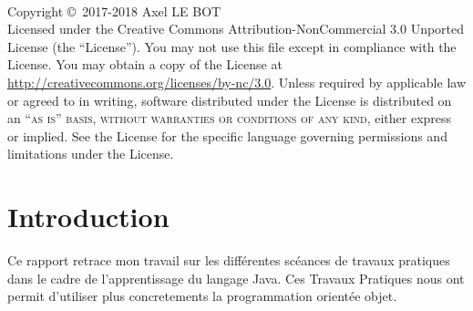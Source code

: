 \documentclass[12pt,a4paper]{book} %
\begin{document}

\newpage
~\vfill
\thispagestyle{empty}

\noindent Copyright \copyright\ 2017-2018 Axel LE BOT \\ %

\noindent Licensed under the Creative Commons Attribution-NonCommercial 3.0 Unported License (the ``License''). You may not use this file except in compliance with the License. You may obtain a copy of the License at \url{http://creativecommons.org/licenses/by-nc/3.0}. Unless required by applicable law or agreed to in writing, software distributed under the License is distributed on an \textsc{``as is'' basis, without warranties or conditions of any kind}, either express or implied. See the License for the specific language governing permissions and limitations under the License.\\ %


\pagestyle{empty} %


\chapter*{Introduction}

Ce rapport retrace mon travail sur les différentes scéances de travaux pratiques dans le cadre de l'apprentissage du langage Java. Ces Travaux Pratiques nous ont permit d'utiliser plus concretements la programmation orientée objet.
\end{document}
